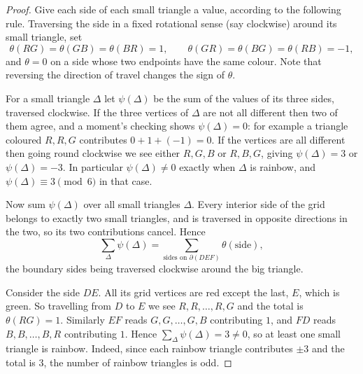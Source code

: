 \begin{proof}
	Give each side of each small triangle a value, according to the following rule. Traversing the side in a fixed rotational sense (say clockwise) around its small triangle, set
	$$\theta(RG) = \theta(GB) = \theta(BR) = 1, \qquad \theta(GR)=\theta(BG)=\theta(RB) = -1,$$
	and $\theta = 0$ on a side whose two endpoints have the same colour. Note that reversing the direction of travel changes the sign of $\theta$.

	For a small triangle $\Delta$ let $\psi(\Delta)$ be the sum of the values of its three sides, traversed clockwise. If the three vertices of $\Delta$ are not all different then two of them agree, and a moment's checking shows $\psi(\Delta) = 0$: for example a triangle coloured $R,R,G$ contributes $0 + 1 + (-1) = 0$. If the vertices are all different then going round clockwise we see either $R,G,B$ or $R,B,G$, giving $\psi(\Delta) = 3$ or $\psi(\Delta) = -3$. In particular $\psi(\Delta) \neq 0$ exactly when $\Delta$ is rainbow, and $\psi(\Delta) \equiv 3 \pmod 6$ in that case.

	Now sum $\psi(\Delta)$ over all small triangles $\Delta$. Every interior side of the grid belongs to exactly two small triangles, and is traversed in opposite directions in the two, so its two contributions cancel. Hence
	$$\sum_\Delta \psi(\Delta) = \sum_{\text{sides on }\partial(DEF)} \theta(\text{side}),$$
	the boundary sides being traversed clockwise around the big triangle.

	Consider the side $DE$. All its grid vertices are red except the last, $E$, which is green. So travelling from $D$ to $E$ we see $R,R,\ldots,R,G$ and the total is $\theta(RG) = 1$. Similarly $EF$ reads $G,G,\ldots,G,B$ contributing $1$, and $FD$ reads $B,B,\ldots,B,R$ contributing $1$. Hence $\sum_\Delta \psi(\Delta) = 3 \neq 0$, so at least one small triangle is rainbow. Indeed, since each rainbow triangle contributes $\pm3$ and the total is $3$, the number of rainbow triangles is odd.
\end{proof}

